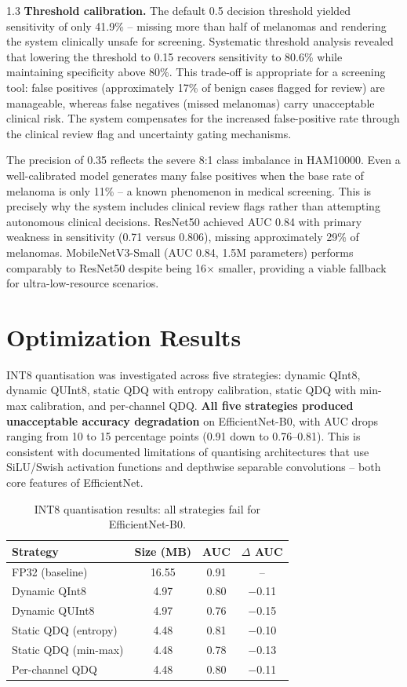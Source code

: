 \begin{spacing}{1.3}
\textbf{Threshold calibration.} The default 0.5 decision threshold yielded sensitivity of only 41.9\% -- missing more than half of melanomas and rendering the system clinically unsafe for screening. Systematic threshold analysis revealed that lowering the threshold to 0.15 recovers sensitivity to 80.6\% while maintaining specificity above 80\%. This trade-off is appropriate for a screening tool: false positives (approximately 17\% of benign cases flagged for review) are manageable, whereas false negatives (missed melanomas) carry unacceptable clinical risk. The system compensates for the increased false-positive rate through the clinical review flag and uncertainty gating mechanisms.

The precision of 0.35 reflects the severe 8:1 class imbalance in HAM10000. Even a well-calibrated model generates many false positives when the base rate of melanoma is only 11\% -- a known phenomenon in medical screening. This is precisely why the system includes clinical review flags rather than attempting autonomous clinical decisions. ResNet50 achieved AUC 0.84 with primary weakness in sensitivity (0.71 versus 0.806), missing approximately 29\% of melanomas. MobileNetV3-Small (AUC 0.84, 1.5M parameters) performs comparably to ResNet50 despite being 16$\times$ smaller, providing a viable fallback for ultra-low-resource scenarios.

\section{Optimization Results}

\label{sec:optimization}
INT8 quantisation was investigated across five strategies: dynamic QInt8, dynamic QUInt8, static QDQ with entropy calibration, static QDQ with min-max calibration, and per-channel QDQ. \textbf{All five strategies produced unacceptable accuracy degradation} on EfficientNet-B0, with AUC drops ranging from 10 to 15 percentage points (0.91 down to 0.76--0.81). This is consistent with documented limitations of quantising architectures that use SiLU/Swish activation functions and depthwise separable convolutions -- both core features of EfficientNet.

\begin{table}[H]
\centering
\caption{INT8 quantisation results: all strategies fail for EfficientNet-B0.}
\label{tab:quant_results}
\begin{tabular}{lccc}
\toprule
\textbf{Strategy} & \textbf{Size (MB)} & \textbf{AUC} & \textbf{$\Delta$ AUC} \\
\midrule
FP32 (baseline)       & 16.55 & 0.91  & -- \\
Dynamic QInt8         & 4.97  & 0.80  & $-$0.11 \\
Dynamic QUInt8        & 4.97  & 0.76  & $-$0.15 \\
Static QDQ (entropy)  & 4.48  & 0.81  & $-$0.10 \\
Static QDQ (min-max)  & 4.48  & 0.78  & $-$0.13 \\
Per-channel QDQ       & 4.48  & 0.80  & $-$0.11 \\
\bottomrule
\end{tabular}
\end{table}


\end{spacing}
